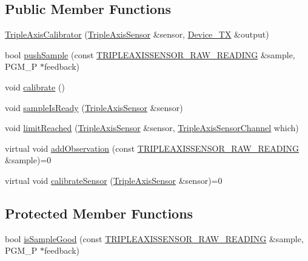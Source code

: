\subsection*{Public Member Functions}
\begin{DoxyCompactItemize}
\item 
\hyperlink{classflame_1_1_triple_axis_calibrator_a7e2fcf4739bff86d4f3c69b2b7025265}{Triple\-Axis\-Calibrator} (\hyperlink{classflame_1_1_triple_axis_sensor}{Triple\-Axis\-Sensor} \&sensor, \hyperlink{classflame_1_1_device___t_x}{Device\-\_\-\-T\-X} \&output)
\item 
bool \hyperlink{classflame_1_1_triple_axis_calibrator_a35446f4f0c1ab5b6ef203c3e0fabda9c}{push\-Sample} (const \hyperlink{namespaceflame_ab883ad815041824ba548753dae327bc2}{T\-R\-I\-P\-L\-E\-A\-X\-I\-S\-S\-E\-N\-S\-O\-R\-\_\-\-R\-A\-W\-\_\-\-R\-E\-A\-D\-I\-N\-G} \&sample, P\-G\-M\-\_\-\-P $\ast$feedback)
\item 
void \hyperlink{classflame_1_1_triple_axis_calibrator_a95729b080aee3846856ea91c0f9fa73b}{calibrate} ()
\item 
void \hyperlink{classflame_1_1_triple_axis_calibrator_ab66474b4d1f8f6e9c2ee76233a927e71}{sample\-Is\-Ready} (\hyperlink{classflame_1_1_triple_axis_sensor}{Triple\-Axis\-Sensor} \&sensor)
\item 
void \hyperlink{classflame_1_1_triple_axis_calibrator_af80e930aac780ea5b25f99423fb22fd7}{limit\-Reached} (\hyperlink{classflame_1_1_triple_axis_sensor}{Triple\-Axis\-Sensor} \&sensor, \hyperlink{namespaceflame_a626e8c99d0f4f232b95e7089c113095a}{Triple\-Axis\-Sensor\-Channel} which)
\item 
virtual void \hyperlink{classflame_1_1_triple_axis_calibrator_a088b330f58f52e7d3df291cc6e8bafed}{add\-Observation} (const \hyperlink{namespaceflame_ab883ad815041824ba548753dae327bc2}{T\-R\-I\-P\-L\-E\-A\-X\-I\-S\-S\-E\-N\-S\-O\-R\-\_\-\-R\-A\-W\-\_\-\-R\-E\-A\-D\-I\-N\-G} \&sample)=0
\item 
virtual void \hyperlink{classflame_1_1_triple_axis_calibrator_a1a22ce8da6a3e3672f59e876acd3796b}{calibrate\-Sensor} (\hyperlink{classflame_1_1_triple_axis_sensor}{Triple\-Axis\-Sensor} \&sensor)=0
\end{DoxyCompactItemize}
\subsection*{Protected Member Functions}
\begin{DoxyCompactItemize}
\item 
bool \hyperlink{classflame_1_1_triple_axis_calibrator_af433d139c778c5c934ca429bbdb430c2}{is\-Sample\-Good} (const \hyperlink{namespaceflame_ab883ad815041824ba548753dae327bc2}{T\-R\-I\-P\-L\-E\-A\-X\-I\-S\-S\-E\-N\-S\-O\-R\-\_\-\-R\-A\-W\-\_\-\-R\-E\-A\-D\-I\-N\-G} \&sample, P\-G\-M\-\_\-\-P $\ast$feedback)
\end{DoxyCompactItemize}
